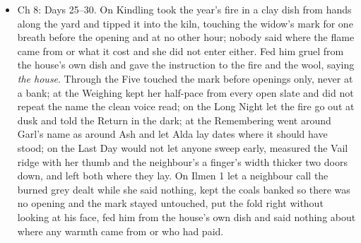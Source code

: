 \documentclass{design/chronicle}
\begin{document}
{\begin{itemize}[leftmargin=1.4em,itemsep=1pt,topsep=3pt,parsep=0pt]
\end{itemize}

\begin{itemize}[leftmargin=1.4em,itemsep=1pt,topsep=3pt,parsep=0pt]

\item Ch 8: Days 25--30. On Kindling took the year’s fire in a clay dish from hands along the yard and tipped it into the kiln, touching the widow’s mark for one breath before the opening and at no other hour; nobody said where the flame came from or what it cost and she did not enter either. Fed him gruel from the house’s own dish and gave the instruction to the fire and the wool, saying \emph{the house}. Through the Five touched the mark before openings only, never at a bank; at the Weighing kept her half-pace from every open slate and did not repeat the name the clean voice read; on the Long Night let the fire go out at dusk and told the Return in the dark; at the Remembering went around Garl’s name as around Ash and let Alda lay dates where it should have stood; on the Last Day would not let anyone sweep early, measured the Vail ridge with her thumb and the neighbour’s a finger’s width thicker two doors down, and left both where they lay. On Ilmen 1 let a neighbour call the burned grey dealt while she said nothing, kept the coals banked so there was no opening and the mark stayed untouched, put the fold right without looking at his face, fed him from the house’s own dish and said nothing about where any warmth came from or who had paid.

\end{itemize}

\begin{itemize}[leftmargin=1.4em,itemsep=1pt,topsep=3pt,parsep=0pt]


\end{itemize}}
\end{document}
